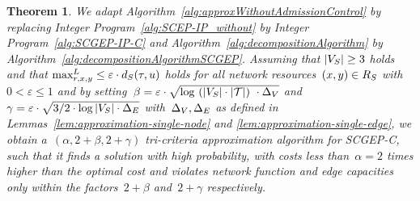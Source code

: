 \documentclass[10pt, conference, letterpaper]{IEEEtran}
\newtheorem{theorem}{Theorem}
\begin{document}
\begin{theorem}
\label{thm:result-for-admission-control-without-scgep}
We adapt Algorithm~\ref{alg:approxWithoutAdmissionControl} by replacing Integer Program~\ref{alg:SCEP-IP_without} by Integer Program~\ref{alg:SCGEP-IP-C} and Algorithm~\ref{alg:decompositionAlgorithm} by Algorithm~\ref{alg:decompositionAlgorithmSCGEP}.
Assuming that $|V_S| \geq 3$ holds and that $\maxLoadV[\req][x][y] \leq \varepsilon \cdot \Scap(\type,u)$ holds for all network resources~$(x,y) \in  R_{S}$ with $0 < \varepsilon \leq 1$ and by setting~$\beta = \varepsilon \cdot \sqrt{\log~(|V_S|\cdot|\mathcal{T}|)~\cdot \Delta_V  }$ and~$\gamma = \varepsilon \cdot \sqrt{3/2\cdot \log |V_S| \cdot \Delta_E  }$ with~$\Delta_V,\Delta_E$ as defined in Lemmas~\ref{lem:approximation-single-node} and \ref{lem:approximation-single-edge}, we obtain a~$(\alpha,2+\beta,2+\gamma)$ tri-criteria approximation algorithm for SCGEP-C, such that it finds a solution \emph{with high probability}, with costs less than~$\alpha = 2$ times higher than the optimal cost and violates network function and edge capacities only within the factors~$2+\beta$ and~$2+\gamma$ respectively.
\end{theorem}
\end{document}
